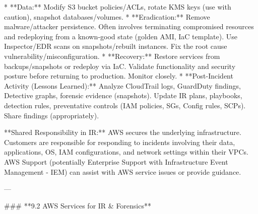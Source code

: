\documentclass{article}
\begin{document}
    * **Data:** Modify S3 bucket policies/ACLs, rotate KMS keys (use with caution), snapshot databases/volumes.
* **Eradication:** Remove malware/attacker persistence. Often involves terminating compromised resources and redeploying from a known-good state (golden AMI, IaC template). Use Inspector/EDR scans on snapshots/rebuilt instances. Fix the root cause vulnerability/misconfiguration.
* **Recovery:** Restore services from backups/snapshots or redeploy via IaC. Validate functionality and security posture before returning to production. Monitor closely.
* **Post-Incident Activity (Lessons Learned):** Analyze CloudTrail logs, GuardDuty findings, Detective graphs, forensic evidence (snapshots). Update IR plans, playbooks, detection rules, preventative controls (IAM policies, SGs, Config rules, SCPs). Share findings (appropriately).

**Shared Responsibility in IR:** AWS secures the underlying infrastructure. Customers are responsible for responding to incidents involving their data, applications, OS, IAM configurations, and network settings within their VPCs. AWS Support (potentially Enterprise Support with Infrastructure Event Management - IEM) can assist with AWS service issues or provide guidance.

---

### **9.2 AWS Services for IR & Forensics**
\end{document}
